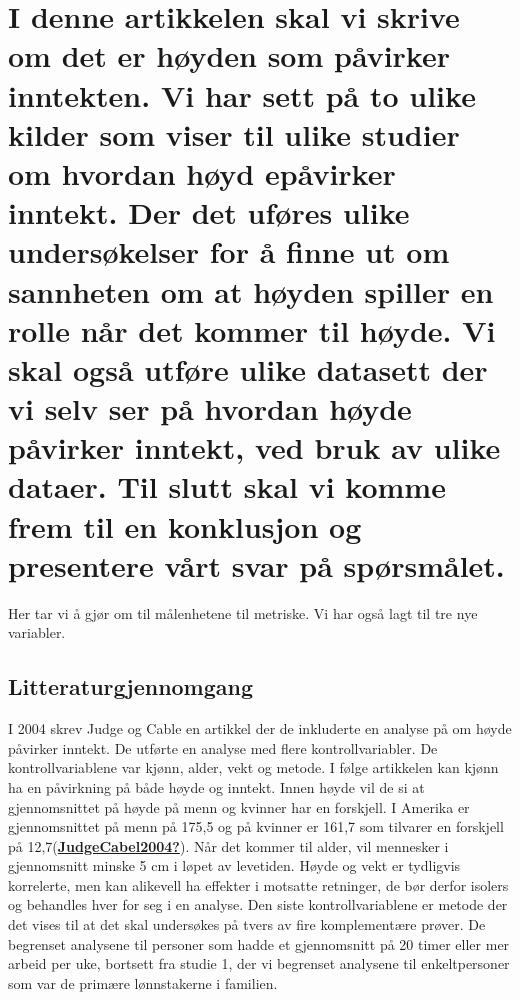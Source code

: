 \documentclass[
  12pt,
  norsk,
]{article}
\begin{document}
\hypertarget{i-denne-artikkelen-skal-vi-skrive-om-det-er-huxf8yden-som-puxe5virker-inntekten.-vi-har-sett-puxe5-to-ulike-kilder-som-viser-til-ulike-studier-om-hvordan-huxf8yd-epuxe5virker-inntekt.-der-det-ufuxf8res-ulike-undersuxf8kelser-for-uxe5-finne-ut-om-sannheten-om-at-huxf8yden-spiller-en-rolle-nuxe5r-det-kommer-til-huxf8yde.-vi-skal-ogsuxe5-utfuxf8re-ulike-datasett-der-vi-selv-ser-puxe5-hvordan-huxf8yde-puxe5virker-inntekt-ved-bruk-av-ulike-dataer.-til-slutt-skal-vi-komme-frem-til-en-konklusjon-og-presentere-vuxe5rt-svar-puxe5-spuxf8rsmuxe5let.}{%
\section{I denne artikkelen skal vi skrive om det er høyden som påvirker
inntekten. Vi har sett på to ulike kilder som viser til ulike studier om
hvordan høyd epåvirker inntekt. Der det uføres ulike undersøkelser for å
finne ut om sannheten om at høyden spiller en rolle når det kommer til
høyde. Vi skal også utføre ulike datasett der vi selv ser på hvordan
høyde påvirker inntekt, ved bruk av ulike dataer. Til slutt skal vi
komme frem til en konklusjon og presentere vårt svar på
spørsmålet.}\label{i-denne-artikkelen-skal-vi-skrive-om-det-er-huxf8yden-som-puxe5virker-inntekten.-vi-har-sett-puxe5-to-ulike-kilder-som-viser-til-ulike-studier-om-hvordan-huxf8yd-epuxe5virker-inntekt.-der-det-ufuxf8res-ulike-undersuxf8kelser-for-uxe5-finne-ut-om-sannheten-om-at-huxf8yden-spiller-en-rolle-nuxe5r-det-kommer-til-huxf8yde.-vi-skal-ogsuxe5-utfuxf8re-ulike-datasett-der-vi-selv-ser-puxe5-hvordan-huxf8yde-puxe5virker-inntekt-ved-bruk-av-ulike-dataer.-til-slutt-skal-vi-komme-frem-til-en-konklusjon-og-presentere-vuxe5rt-svar-puxe5-spuxf8rsmuxe5let.}}

Her tar vi å gjør om til målenhetene til metriske. Vi har også lagt til
tre nye variabler.

\hypertarget{litteraturgjennomgang}{%
\subsection{Litteraturgjennomgang}\label{litteraturgjennomgang}}

I 2004 skrev Judge og Cable en artikkel der de inkluderte en analyse på
om høyde påvirker inntekt. De utførte en analyse med flere
kontrollvariabler. De kontrollvariablene var kjønn, alder, vekt og
metode. I følge artikkelen kan kjønn ha en påvirkning på både høyde og
inntekt. Innen høyde vil de si at gjennomsnittet på høyde på menn og
kvinner har en forskjell. I Amerika er gjennomsnittet på menn på 175,5
og på kvinner er 161,7 som tilvarer en forskjell på
12,7(\protect\hyperlink{ref-JudgeCabel2004}{\textbf{JudgeCabel2004?}}).
Når det kommer til alder, vil mennesker i gjennomsnitt minske 5 cm i
løpet av levetiden. Høyde og vekt er tydligvis korrelerte, men kan
alikevell ha effekter i motsatte retninger, de bør derfor isolers og
behandles hver for seg i en analyse. Den siste kontrollvariablene er
metode der det vises til at det skal undersøkes på tvers av fire
komplementære prøver. De begrenset analysene til personer som hadde et
gjennomsnitt på 20 timer eller mer arbeid per uke, bortsett fra studie
1, der vi begrenset analysene til enkeltpersoner som var de primære
lønnstakerne i familien.
\end{document}
